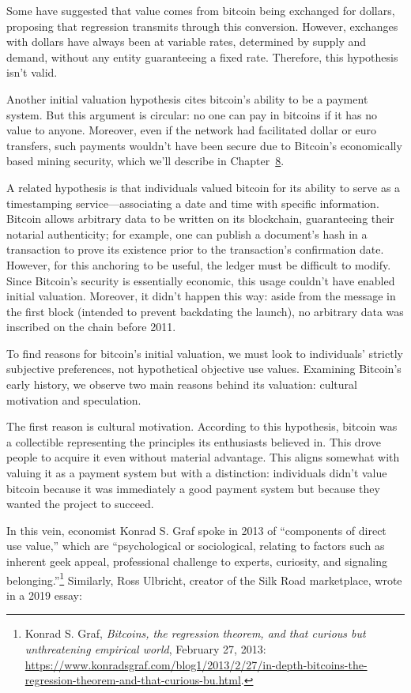\documentclass[
  a5paper,
  smalldemyvopaper,10pt,twoside,onecolumn,openright,extrafontsizes,hidelinks]{memoir}
\begin{document}
Some have suggested that value comes from bitcoin being exchanged for
dollars, proposing that regression transmits through this conversion.
However, exchanges with dollars have always been at variable rates,
determined by supply and demand, without any entity guaranteeing a fixed
rate. Therefore, this hypothesis isn't valid.

Another initial valuation hypothesis cites bitcoin's ability to be a
payment system. But this argument is circular: no one can pay in
bitcoins if it has no value to anyone. Moreover, even if the network had
facilitated dollar or euro transfers, such payments wouldn't have been
secure due to Bitcoin's economically based mining security, which we'll
describe in Chapter~\hyperref[ch:confirmation]{8}.

A related hypothesis is that individuals valued bitcoin for its ability
to serve as a timestamping service---associating a date and time with
specific information. Bitcoin allows arbitrary data to be written on its
blockchain, guaranteeing their notarial authenticity; for example, one
can publish a document's hash in a transaction to prove its existence
prior to the transaction's confirmation date. However, for this
anchoring to be useful, the ledger must be difficult to modify. Since
Bitcoin's security is essentially economic, this usage couldn't have
enabled initial valuation. Moreover, it didn't happen this way: aside
from the message in the first block (intended to prevent backdating the
launch), no arbitrary data was inscribed on the chain before 2011.

To find reasons for bitcoin's initial valuation, we must look to
individuals' strictly subjective preferences, not hypothetical objective
use values. Examining Bitcoin's early history, we observe two main
reasons behind its valuation: cultural motivation and speculation.

The first reason is cultural motivation. According to this hypothesis,
bitcoin was a collectible representing the principles its enthusiasts
believed in. This drove people to acquire it even without material
advantage. This aligns somewhat with valuing it as a payment system but
with a distinction: individuals didn't value bitcoin because it was
immediately a good payment system but because they wanted the project to
succeed.

In this vein, economist Konrad S. Graf spoke in 2013 of ``components of
direct use value,'' which are ``psychological or sociological, relating
to factors such as inherent geek appeal, professional challenge to
experts, curiosity, and signaling belonging.''\footnote{Konrad S. Graf,
  \emph{Bitcoins, the regression theorem, and that curious but
  unthreatening empirical world}, February 27, 2013:
  \url{https://www.konradsgraf.com/blog1/2013/2/27/in-depth-bitcoins-the-regression-theorem-and-that-curious-bu.html}.}
Similarly, Ross Ulbricht, creator of the Silk Road marketplace, wrote in
a 2019 essay:
\end{document}
